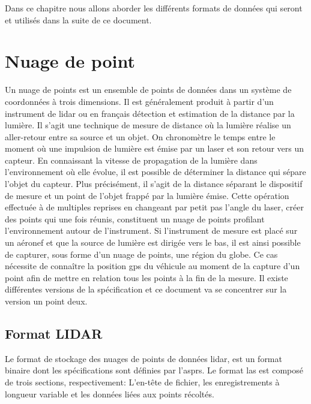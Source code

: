 Dans ce chapitre nous allons aborder les différents formats de données qui seront
et utilisés dans la suite de ce document.

\section{Nuage de point}
Un nuage de points est un ensemble de points de données dans un système de
coordonnées à trois dimensions. Il est généralement produit à partir d'un
instrument de \gls{lidar} ou en français détection et estimation de la distance
par la lumière. Il s'agit une technique de mesure de distance où la lumière réalise un 
aller-retour entre sa source et un objet. On chronomètre le temps entre le moment 
où une impulsion de lumière est émise par un laser et son retour vers un capteur.
En connaissant la vitesse de propagation de la lumière dans l’environnement où elle
évolue, il est possible de déterminer la distance qui sépare l’objet du capteur.
Plus précisément, il s’agit de la distance séparant le dispositif de mesure et
un point de l’objet frappé par la lumière émise. 
Cette opération effectuée à de multiples reprises en changeant par petit pas 
l’angle du laser, créer des points qui une fois réunis, constituent un nuage de points profilant l'environnement autour de l'instrument.
Si l'instrument de mesure est placé sur un aéronef et que la source de lumière est
dirigée vers le bas, il est ainsi possible de capturer, sous forme d'un nuage de
points, une région du globe. Ce cas nécessite de connaître la position
\gls{gps} du véhicule au moment de la capture d'un point afin de mettre en relation
tous les points à la fin de la mesure.
Il existe différentes versions de la spécification et ce document va se concentrer sur la version un point deux.

\subsection{Format LIDAR}
Le format de stockage des nuages de points de données \gls{lidar}, est un format
binaire dont les spécifications sont définies par l'\gls{asprs}.
Le format \gls{las} est composé de trois sections, respectivement:
L'en-tête de fichier, les enregistrements à longueur variable et les données liées aux points récoltés.

